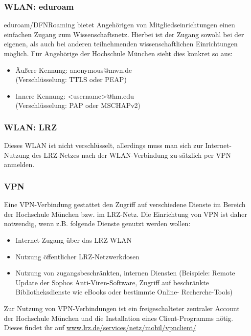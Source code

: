 \subsubsection{WLAN: eduroam}

eduroam/DFNRoaming bietet Angehörigen von Mitgliedseinrichtungen einen einfachen Zugang zum Wissenschaftsnetz. Hierbei ist der Zugang sowohl bei der eigenen, als auch bei anderen teilnehmenden wissenschaftlichen Einrichtungen möglich.\doublebreak
Für Angehörige der Hochschule München sieht dies konkret so aus:
\begin{itemize}
		 \item{Äußere Kennung: anonymous@mwn.de\\ (Verschlüsselung: TTLS oder PEAP)}
		 \item{Innere Kennung: \textless username\textgreater @hm.edu\\ (Verschlüsselung: PAP oder MSCHAPv2)}
\end{itemize}


\subsubsection{WLAN: LRZ}

Dieses WLAN ist nicht verschlüsselt, allerdings muss man sich zur Internet-Nutzung des LRZ-Netzes nach der WLAN-Verbindung zu-sätzlich per VPN anmelden.

\subsubsection{VPN}

Eine VPN-Verbindung gestattet den Zugriff auf verschiedene Dienste im Bereich der Hochschule München bzw. im LRZ-Netz. Die Einrichtung von VPN ist daher notwendig, wenn z.B. folgende Dienste genutzt werden wollen:

\begin{itemize}
	\item{Internet-Zugang über das LRZ-WLAN}
	\item{Nutzung öffentlicher LRZ-Netzwerkdosen}
	\item{Nutzung von zugangsbeschränkten, internen Diensten (Beispiele: Remote Update der Sophos Anti-Viren-Software, Zugriff auf beschränkte Bibliotheksdienste wie eBooks oder bestimmte Online- Recherche-Tools)}
\end{itemize}
Zur Nutzung von VPN-Verbindungen ist ein freigeschalteter zentraler Account der Hochschule München und die Installation eines Client-Programms nötig. Dieses findet ihr auf \url{www.lrz.de/services/netz/mobil/vpnclient/}

